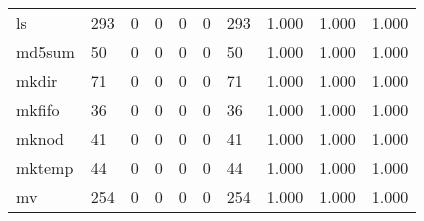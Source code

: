 \begin{longtable}{lp{2.0cm}p{2.0cm}p{2.0cm}p{2.0cm}p{2.0cm}p{2.0cm}p{2.0cm}p{2.0cm}p{2.0cm}}
ls        &                    293 &                                             0 &                                            0 &                                           0 &                                            0 &                                        293 &                                1.000 &                                  1.000 &                                1.000 \\
md5sum    &                     50 &                                             0 &                                            0 &                                           0 &                                            0 &                                         50 &                                1.000 &                                  1.000 &                                1.000 \\
mkdir     &                     71 &                                             0 &                                            0 &                                           0 &                                            0 &                                         71 &                                1.000 &                                  1.000 &                                1.000 \\
mkfifo    &                     36 &                                             0 &                                            0 &                                           0 &                                            0 &                                         36 &                                1.000 &                                  1.000 &                                1.000 \\
mknod     &                     41 &                                             0 &                                            0 &                                           0 &                                            0 &                                         41 &                                1.000 &                                  1.000 &                                1.000 \\
mktemp    &                     44 &                                             0 &                                            0 &                                           0 &                                            0 &                                         44 &                                1.000 &                                  1.000 &                                1.000 \\
mv        &                    254 &                                             0 &                                            0 &                                           0 &                                            0 &                                        254 &                                1.000 &                                  1.000 &                                1.000 \\

\end{longtable}
